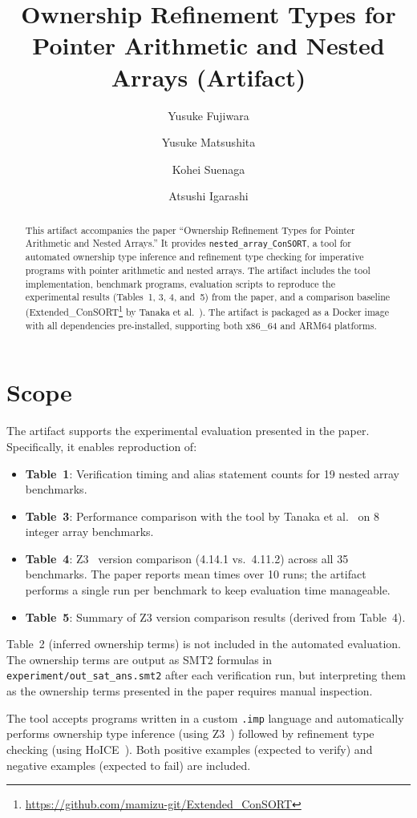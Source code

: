 \documentclass[a4paper,USenglish]{darts-v2021}
\title{Ownership Refinement Types for Pointer Arithmetic and Nested Arrays (Artifact)}
\author{Yusuke Fujiwara}{Kyoto University, Kyoto, Japan}{yfujiwara@fos.kuis.kyoto-u.ac.jp}{https://orcid.org/0009-0004-8423-0782}{}
\author{Yusuke Matsushita}{Kyoto University, Kyoto, Japan}{ymat@fos.kuis.kyoto-u.ac.jp}{https://orcid.org/0000-0002-5208-3106}{His research was supported in part also by the Hakubi Project at Kyoto University and JSPS KAKENHI Grant Number JP24KJ0133.}
\author{Kohei Suenaga}{Kyoto University, Kyoto, Japan}{kohei.suenaga@acm.org}{https://orcid.org/0000-0002-7466-8789}{His research was supported in part also by JST CREST Grant Number JPMJCR2012, Japan, and JSPS KAKENHI Grant Number 25H01113, Japan.}
\author{Atsushi Igarashi}{Kyoto University, Kyoto, Japan}{igarashi@kuis.kyoto-u.ac.jp}{https://orcid.org/0000-0002-5143-9764}{}
\newenvironment{scope}{\section{Scope}}{}
\begin{document}
\maketitle

\begin{abstract}
This artifact accompanies the paper ``Ownership Refinement Types for Pointer Arithmetic and Nested Arrays.''
It provides \texttt{nested\_array\_ConSORT}, a tool for automated ownership type inference and
refinement type checking for imperative programs with pointer arithmetic and nested arrays.
The artifact includes the tool implementation, benchmark programs, evaluation scripts to
reproduce the experimental results (Tables~1, 3, 4, and~5) from the paper, and a comparison baseline
(Extended\_ConSORT\footnote{\url{https://github.com/mamizu-git/Extended_ConSORT}} by Tanaka et al.~\cite{tanaka}).
The artifact is packaged as a Docker image with all dependencies pre-installed,
supporting both x86\_64 and ARM64 platforms.
\end{abstract}


\begin{scope}

The artifact supports the experimental evaluation presented in the paper.
Specifically, it enables reproduction of:

\begin{itemize}
  \item \textbf{Table~1}: Verification timing and alias statement counts for 19 nested array benchmarks.
  \item \textbf{Table~3}: Performance comparison with the tool by Tanaka et al.~\cite{tanaka} on 8 integer array benchmarks.
  \item \textbf{Table~4}: Z3~\cite{z3} version comparison (4.14.1 vs.\ 4.11.2) across all 35 benchmarks.
        The paper reports mean times over 10 runs; the artifact performs a single run per benchmark
        to keep evaluation time manageable.
  \item \textbf{Table~5}: Summary of Z3 version comparison results (derived from Table~4).
\end{itemize}

Table~2 (inferred ownership terms) is not included in the automated evaluation.
The ownership terms are output as SMT2 formulas in \texttt{experiment/out\_sat\_ans.smt2}
after each verification run, but interpreting them as the ownership terms presented in the
paper requires manual inspection.

The tool accepts programs written in a custom \texttt{.imp} language and automatically
performs ownership type inference (using Z3~\cite{z3}) followed by refinement type checking (using HoICE~\cite{hoice}).
Both positive examples (expected to verify) and negative examples (expected to fail) are included.
\end{scope}
\end{document}
